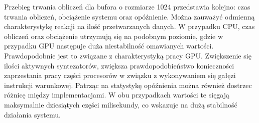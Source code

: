 Przebieg trwania obliczeń dla bufora o rozmiarze 1024 przedstawia kolejno: czas trwania obliczeń, obciążenie systemu oraz opóźnienie. Można zauważyć odmienną charakterystykę reakcji na ilość przetwarzanych danych. W przypadku CPU, czas obliczeń oraz obciążenie utrzymują się na podobnym poziomie, gdzie w przypadku GPU następuje duża niestabilność omawianych wartości. Prawdopodobnie jest to związane z charakterystyką pracy GPU. Zwiększenie się ilości aktywnych syntezatorów, zwiększa prawdopodobieństwo konieczności zaprzestania pracy części procesorów w związku z wykonywaniem się gałęzi instrukcji warunkowej. Patrząc na statystykę opóźnienia można również dostrzec różnicę między implementacjami. W obu przypadkach wartości te sięgają maksymalnie dziesiątych części milisekundy, co wskazuje na dużą stabilność działania systemu.
